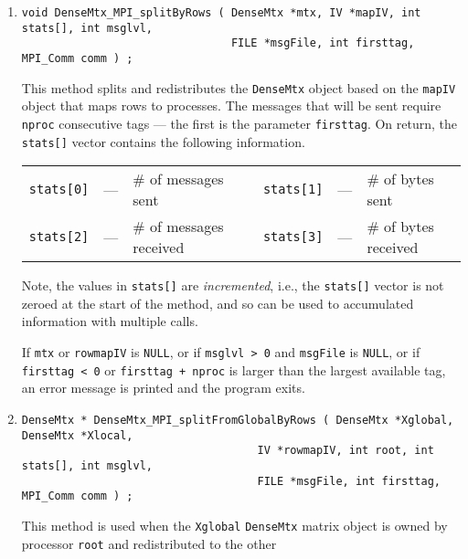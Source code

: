 \begin{enumerate}
\item
\begin{verbatim}
void DenseMtx_MPI_splitByRows ( DenseMtx *mtx, IV *mapIV, int stats[], int msglvl, 
                                FILE *msgFile, int firsttag, MPI_Comm comm ) ;
\end{verbatim}
This method splits and redistributes the {\tt DenseMtx} object based 
on the {\tt mapIV} object that maps rows to processes.
The messages that will be sent require {\tt nproc} consecutive tags
--- the first is the parameter {\tt firsttag}.
On return, the {\tt stats[]} vector contains the following
information.
\par
\begin{center}
\begin{tabular}{cclcccl}
{\tt stats[0]} & --- & \# of messages sent 
& &
{\tt stats[1]} & --- & \# of bytes sent \\
{\tt stats[2]} & --- & \# of messages received 
& &
{\tt stats[3]} & --- & \# of bytes received 
\end{tabular}
\end{center}
\par
Note, the values in {\tt stats[]} are {\it incremented}, i.e.,
the {\tt stats[]} vector is not zeroed at the start of the method,
and so can be used to accumulated information with multiple calls.
\par {}
If {\tt mtx} or {\tt rowmapIV} is {\tt NULL},
or if {\tt msglvl > 0} and {\tt msgFile} is {\tt NULL},
or if {\tt firsttag < 0} or {\tt firsttag + nproc} 
is larger than the largest available tag,
an error message is printed and the program exits.
\item
\begin{verbatim}
DenseMtx * DenseMtx_MPI_splitFromGlobalByRows ( DenseMtx *Xglobal, DenseMtx *Xlocal, 
                                    IV *rowmapIV, int root, int stats[], int msglvl, 
                                    FILE *msgFile, int firsttag, MPI_Comm comm ) ;
\end{verbatim}
This method is used when the {\tt Xglobal} {\tt DenseMtx} matrix object
is owned by processor {\tt root} and redistributed to the other

\end{enumerate}
